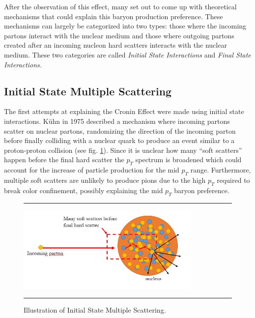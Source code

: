 After the observation of this effect, many set out to come up with theoretical mechanisms that could explain this baryon production preference. These mechanisms can largely be categorized into two types: those where the incoming partons interact with the nuclear medium and those where outgoing partons created after an incoming nucleon hard scatters interacts with the nuclear medium. These two categories are called \textit{Initial State Interactions} and \textit{Final State Interactions.}

\subsection{Initial State Multiple Scattering}
The first attempts at explaining the Cronin Effect were made using initial state interactions. K\"{u}hn in 1975 described a mechanism where incoming partons scatter on nuclear partons, randomizing the direction of the incoming parton before finally colliding with a nuclear quark to produce an event similar to a proton-proton collision\citep{PhysRevD.13.2948} (see fig. \ref{fig:ISIscattering}). Since it is unclear how many ``soft scatters'' happen before the final hard scatter the $p_{T}$ spectrum is broadened which could account for the increase of particle production for the mid $p_{T}$ range. Furthermore, multiple soft scatters are unlikely to produce pions due to the high $p_T$ required to break color confinement, possibly explaining the mid $p_T$ baryon preference.
\begin{figure}[htbp!]
  \centering    \rule{35em}{0.5pt}
    \includegraphics[width=0.8\textwidth]{Figures/ISIscattering.jpg}

  \caption[Illustration of Initial State Multiple Scattering]{Illustration of Initial State Multiple Scattering.}
  \label{fig:ISIscattering}    \rule{35em}{0.5pt}
\end{figure} 

